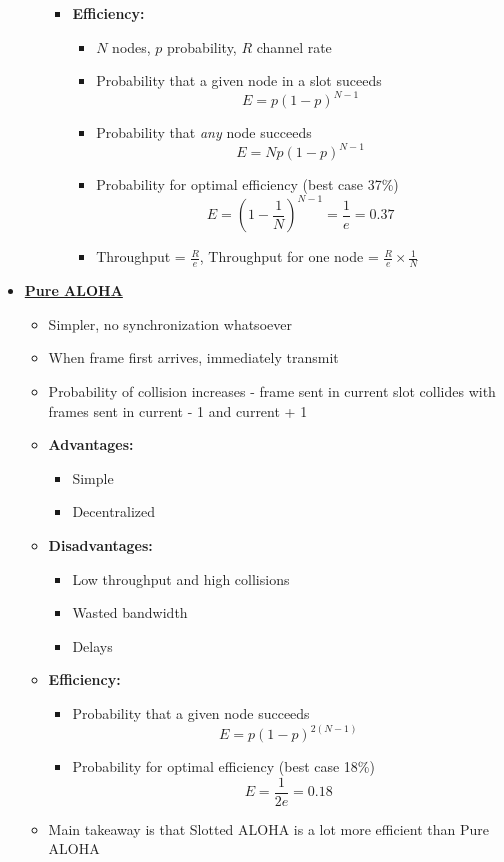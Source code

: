 \documentclass{article}
\begin{document}
\begin{itemize}
\begin{itemize}
\begin{itemize}
                \item \textbf{Efficiency:}
                    \begin{itemize}
                        \item $N$ nodes, $p$ probability, $R$ channel rate
                        \item Probability that a given node in a slot suceeds \[E=p(1-p)^{N-1}\]
                        \item Probability that \textit{any} node succeeds \[E=Np(1-p)^{N-1}\]
                        \item Probability for optimal efficiency (best case 37\%) \[E=(1-\frac{1}{N})^{N-1}=\frac{1}{e}=0.37\]
                        \item Throughput = $\frac{R}{e}$, Throughput for one node = $\frac{R}{e}\times\frac{1}{N}$
                    \end{itemize}
        \end{itemize}
    \end{itemize}

    \item \textbf{\underline{Pure ALOHA}}
    \begin{itemize}
        \item Simpler, no synchronization whatsoever
        \item When frame first arrives, immediately transmit
        \item Probability of collision increases - frame sent in current slot collides with frames sent
            in current - 1 and current + 1
        \item \textbf{Advantages:}
            \begin{itemize}
                \item Simple
                \item Decentralized
            \end{itemize}
        \item \textbf{Disadvantages:}
            \begin{itemize}
                \item Low throughput and high collisions
                \item Wasted bandwidth
                \item Delays
            \end{itemize}
        \item \textbf{Efficiency:}
        \begin{itemize}
            \item Probability that a given node succeeds \[E=p(1-p)^{2(N-1)}\]
            \item Probability for optimal efficiency (best case 18\%)\[E=\frac{1}{2e}=0.18\]
        \end{itemize}
        \item Main takeaway is that Slotted ALOHA is a lot more efficient than Pure ALOHA
    \end{itemize}


\end{itemize}
\end{document}
